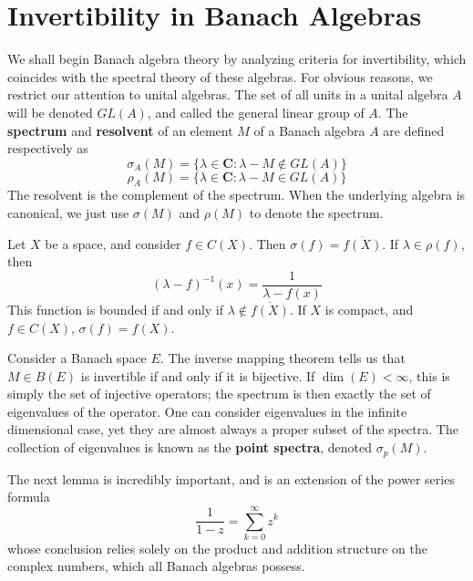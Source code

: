 \section{Invertibility in Banach Algebras}

We shall begin Banach algebra theory by analyzing criteria for invertibility, which coincides with the spectral theory of these algebras. For obvious reasons, we restrict our attention to unital algebras. The set of all units in a unital algebra $A$ will be denoted $GL(A)$, and called the general linear group of $A$. The {\bf spectrum} and {\bf resolvent} of an element $M$ of a Banach algebra $A$ are defined respectively as
%
\[ \sigma_{A}(M) = \{ \lambda \in \mathbf{C} : \lambda - M \not \in GL(A) \} \]
%
\[ \rho_{A}(M) = \{ \lambda \in \mathbf{C} : \lambda - M \in GL(A) \} \]
%
The resolvent is the complement of the spectrum. When the underlying algebra is canonical, we just use $\sigma(M)$ and $\rho(M)$ to denote the spectrum. %

\begin{example}
    Let $X$ be a space, and consider $f \in C(X)$. Then $\sigma(f) = \overline{f(X)}$. If $\lambda \in \rho(f)$, then
    \[ (\lambda - f)^{-1}(x) = \frac{1}{\lambda - f(x)} \]
    This function is bounded if and only if $\lambda \not \in \overline{f(X)}$. If $X$ is compact, and $f \in C(X)$, $\sigma(f) = f(X)$.
\end{example}

\begin{example}
    Consider a Banach space $E$. The inverse mapping theorem tells us that $M \in B(E)$ is invertible if and only if it is bijective. If $\dim(E) < \infty$, this is simply the set of injective operators; the spectrum is then exactly the set of eigenvalues of the operator. One can consider eigenvalues in the infinite dimensional case, yet they are almost always a proper subset of the spectra. The collection of eigenvalues is known as the {\bf point spectra}, denoted $\sigma_p(M)$.
\end{example}

The next lemma is incredibly important, and is an extension of the power series formula
%
\[ \frac{1}{1 - z} = \sum_{k = 0}^\infty z^k \]
%
whose conclusion relies solely on the product and addition structure on the complex numbers, which all Banach algebras possess.

